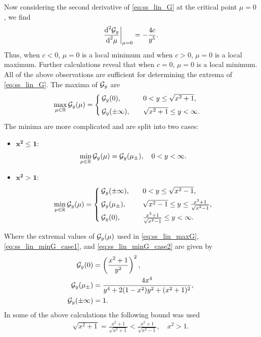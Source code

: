 \documentclass[a4paper,10pt]{article}
\begin{document}
%
Now considering the second derivative of \eqref{eq:ss_lin_G} at the critical point $\mu = 0$, we find
\begin{align*}
\left. \frac{\textrm{d}^2 {\cal G}_y}{\textrm{d}^2 \mu} \right|_{\mu = 0} = - \frac{4c}{y^5}.
\end{align*}
Thus, when $c < 0$, $\mu  =  0$ is a local minimum and when $c > 0$, $\mu = 0$ is a local maximum. Further calculations reveal that when $c = 0$, $\mu = 0$ is a local minimum.\\


All of the above observations are sufficient for determining the extrema of \eqref{eq:ss_lin_G}. The maxima of ${\cal G}_y$ are
\begin{align}
\label{eq:ss_lin_maxG}
\underset{\mu \in \mathbb{R}}{\max} \, {\cal G}_y(\mu) &= 
\begin{cases}
{\cal G}_y(0), \quad &0 <  y \leq \sqrt{x^2 + 1},\\[1ex]
{\cal G}_y(\pm \infty), \quad &\sqrt{x^2 + 1} \leq  y < \infty.
\end{cases}
\end{align}
The minima are more complicated and are split into two cases:
\begin{itemize}
\setlength{\itemsep}{2ex}
\item \underline{$\bm{x^2\leq1}:$}
\begin{align}
\label{eq:ss_lin_minG_case1}
\underset{\mu \in \mathbb{R}}{\min} \, {\cal G}_y(\mu) &= {\cal G}_y(\mu_{\pm}), \quad 0 <  y < \infty.
\end{align}

\item \underline{$\bm{x^2>1}:$}
\begin{align}
\label{eq:ss_lin_minG_case2}
\underset{\mu \in \mathbb{R}}{\min} \, {\cal G}_y(\mu) &= 
\begin{cases}
{\cal G}_y(\pm \infty), \quad &0 <  y \leq \sqrt{x^2 - 1},\\[1ex]
{\cal G}_y(\mu_{\pm}), \quad & \sqrt{x^2 - 1} \leq  y \leq \frac{x^2+1}{\sqrt{x^2 - 1}}, \\[1ex]
{\cal G}_y(0), \quad & \frac{x^2+1}{\sqrt{x^2 - 1}} \leq  y < \infty.
\end{cases}
\end{align}
\end{itemize}
Where the extremal values of ${\cal G}_y(\mu)$ used in \eqref{eq:ss_lin_maxG}, \eqref{eq:ss_lin_minG_case1}, and \eqref{eq:ss_lin_minG_case2} are given by
\begin{align*}
{\cal G}_y(0) &= \left(\frac{x^2 + 1}{y^2}\right)^2, \\
{\cal G}_y(\mu_{\pm}) &= \frac{4x^4}{y^4 + 2(1-x^2)y^2 + (x^2 + 1)^2}, \\
{\cal G}_y(\pm \infty) &= 1.
\end{align*}
In some of the above calculations the following bound was used
\begin{align*}
\sqrt{x^2+1} = \frac{x^2+1}{\sqrt{x^2+1}} < \frac{x^2+1}{\sqrt{x^2-1}}, \quad x^2 > 1.
\end{align*}
\end{document}
